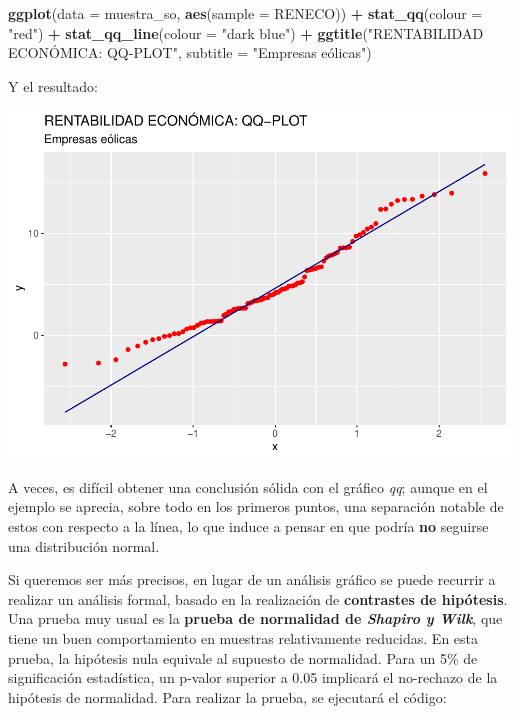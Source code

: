 \documentclass[
]{book}
\newenvironment{Shaded}{\begin{snugshade}}{\end{snugshade}}
\newcommand{\AttributeTok}[1]{\textcolor[rgb]{0.13,0.29,0.53}{#1}}
\newcommand{\FunctionTok}[1]{\textcolor[rgb]{0.13,0.29,0.53}{\textbf{#1}}}
\newcommand{\NormalTok}[1]{#1}
\newcommand{\SpecialCharTok}[1]{\textcolor[rgb]{0.81,0.36,0.00}{\textbf{#1}}}
\newcommand{\StringTok}[1]{\textcolor[rgb]{0.31,0.60,0.02}{#1}}
\let\Oldincludegraphics\includegraphics
\renewcommand{\includegraphics}[2][]{%
  \Oldincludegraphics[#1]{#2}%
}
\begin{document}
\begin{Shaded}
\begin{Highlighting}[]
\FunctionTok{ggplot}\NormalTok{(}\AttributeTok{data =}\NormalTok{ muestra\_so, }\FunctionTok{aes}\NormalTok{(}\AttributeTok{sample =}\NormalTok{ RENECO)) }\SpecialCharTok{+}
  \FunctionTok{stat\_qq}\NormalTok{(}\AttributeTok{colour =} \StringTok{"red"}\NormalTok{) }\SpecialCharTok{+} 
  \FunctionTok{stat\_qq\_line}\NormalTok{(}\AttributeTok{colour =} \StringTok{"dark blue"}\NormalTok{) }\SpecialCharTok{+}
  \FunctionTok{ggtitle}\NormalTok{(}\StringTok{"RENTABILIDAD ECONÓMICA: QQ{-}PLOT"}\NormalTok{, }\AttributeTok{subtitle =} \StringTok{"Empresas eólicas"}\NormalTok{)}
\end{Highlighting}
\end{Shaded}

Y el resultado:

\includegraphics{_main_files/figure-latex/unnamed-chunk-172-1.pdf}

A veces, es difícil obtener una conclusión sólida con el gráfico \emph{qq}; aunque en el ejemplo se aprecia, sobre todo en los primeros puntos, una separación notable de estos con respecto a la línea, lo que induce a pensar en que podría \textbf{no} seguirse una distribución normal.

Si queremos ser más precisos, en lugar de un análisis gráfico se puede recurrir a realizar un análisis formal, basado en la realización de \textbf{contrastes de hipótesis}. Una prueba muy usual es la \textbf{prueba de normalidad de \emph{Shapiro y Wilk}}, que tiene un buen comportamiento en muestras relativamente reducidas. En esta prueba, la hipótesis nula equivale al supuesto de normalidad. Para un 5\% de significación estadística, un p-valor superior a 0.05 implicará el no-rechazo de la hipótesis de normalidad. Para realizar la prueba, se ejecutará el código:
\end{document}
